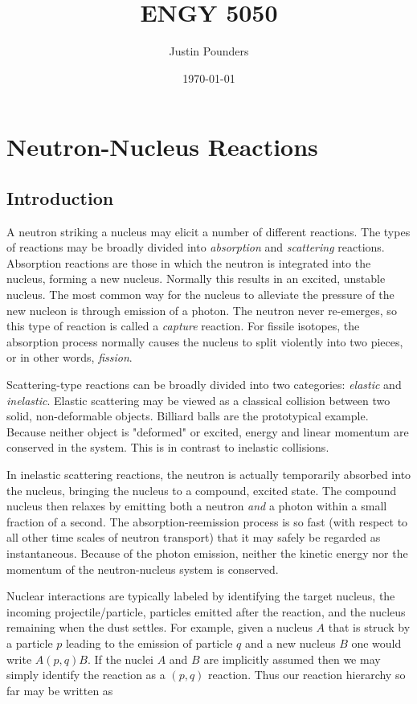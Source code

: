 \documentclass[11pt]{article}
\author{Justin Pounders}
\date{\today}
\title{ENGY 5050}
\begin{document}
\maketitle
\tableofcontents


\section{Neutron-Nucleus Reactions}
\label{sec:orgheadline12}
\subsection{Introduction}
\label{sec:orgheadline1}
A neutron striking a nucleus may elicit a number of different reactions.  The types of reactions may be broadly divided into \emph{absorption} and \emph{scattering} reactions.  Absorption reactions are those in which the neutron is integrated into the nucleus, forming a new nucleus.  Normally this results in an excited, unstable nucleus.  The most common way for the nucleus to alleviate the pressure of the new nucleon is through emission of a photon.  The neutron never re-emerges, so this type of reaction is called a \emph{capture} reaction.  For fissile isotopes, the absorption process normally causes the nucleus to split violently into two pieces, or in other words, \emph{fission}.

Scattering-type reactions can be broadly divided into two categories: \emph{elastic} and \emph{inelastic}.  Elastic scattering may be viewed as a classical collision between two solid, non-deformable objects.  Billiard balls are the prototypical example.  Because neither object is "deformed" or excited, energy and linear momentum are conserved in the system.  This is in contrast to inelastic collisions.  

In inelastic scattering reactions, the neutron is actually temporarily absorbed into the nucleus, bringing the nucleus to a compound, excited state.  The compound nucleus then relaxes by emitting both a neutron \emph{and} a photon within a small fraction of a second.  The absorption-reemission process is so fast (with respect to all other time scales of neutron transport) that it may safely be regarded as instantaneous.  Because of the photon emission, neither the kinetic energy nor the momentum of the neutron-nucleus system is conserved.

Nuclear interactions are typically labeled by identifying the target nucleus, the incoming projectile/particle, particles emitted after the reaction, and the nucleus remaining when the dust settles.  For example, given a nucleus \(A\) that is struck by a particle \(p\) leading to the emission of particle \(q\) and a new nucleus \(B\) one would write \(A(p,q)B\).  If the nuclei \(A\) and \(B\) are implicitly assumed then we may simply identify the reaction as a \((p,q)\) reaction.  Thus our reaction hierarchy so far may be written as
\end{document}
